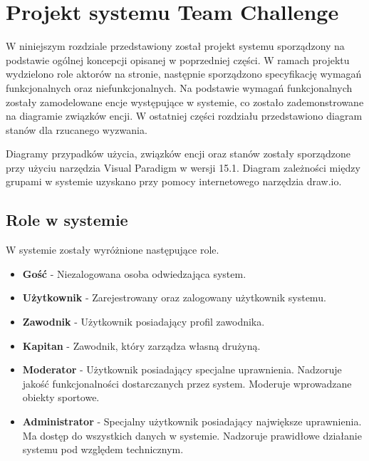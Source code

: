 \chapter{Projekt systemu Team Challenge}

W niniejszym rozdziale przedstawiony został projekt systemu sporządzony na podstawie ogólnej koncepcji opisanej w poprzedniej części. W ramach projektu wydzielono role aktorów na stronie, następnie sporządzono specyfikację wymagań funkcjonalnych oraz niefunkcjonalnych. Na podstawie wymagań funkcjonalnych zostały zamodelowane encje występujące w systemie, co zostało zademonstrowane na diagramie związków encji. W ostatniej części rozdziału przedstawiono diagram stanów dla rzucanego wyzwania.

Diagramy przypadków użycia, związków encji oraz stanów zostały sporządzone przy użyciu narzędzia Visual Paradigm w wersji 15.1. Diagram zależności między grupami w systemie uzyskano przy pomocy internetowego narzędzia draw.io.

\section{Role w systemie}

W systemie zostały wyróżnione następujące role. 

\begin{itemize}

\item \textbf{Gość} - Niezalogowana osoba odwiedzająca system.  

\item \textbf{Użytkownik} - Zarejestrowany oraz zalogowany użytkownik systemu.

\item \textbf{Zawodnik} - Użytkownik posiadający profil zawodnika.  

\item \textbf{Kapitan} - Zawodnik, który zarządza własną drużyną. 

\item \textbf{Moderator} - Użytkownik posiadający specjalne uprawnienia. Nadzoruje jakość funkcjonalności dostarczanych przez system. Moderuje wprowadzane obiekty sportowe.    

\item \textbf{Administrator} - Specjalny użytkownik posiadający największe uprawnienia. Ma dostęp do wszystkich danych w systemie. Nadzoruje prawidłowe działanie systemu pod względem technicznym.  

\end{itemize}



